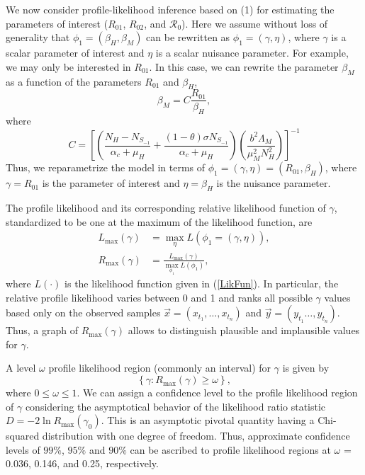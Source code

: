\documentclass[5p, authoryear, final, sort&compress, times]{elsarticle}
\begin{document}
We now consider profile-likelihood inference based on (1) for estimating the parameters of interest ($R_{01}$, $R_{02}$, and $\mathcal{R}_{0}$). Here we assume without loss of generality that $\phi_{1}=\left(\beta_{H},\beta_{M}\right)$ can be rewritten as $\phi_{1}=\left(\gamma,\eta\right)$, where $\gamma$ is a scalar parameter of interest and $\eta$ is a scalar nuisance parameter. For example, we may only be interested in $R_{01}$. In this case, we can rewrite the parameter $\beta_{M}$ as a function of the parameters $R_{01}$ and $\beta_{H}$,
\begin{equation}
\beta_{M}=C\frac{R_{01}}{\beta_{H}}, \nonumber
\end{equation}
where
\begin{equation}
C=\left[\left(\frac{N_H - N_{S_{-1}}}{\alpha_c + \mu_H}+\frac{(1- \theta ) \sigma N_{S_{-1}}}{ \alpha_c + \mu_H}\right)\left(\frac{b^2\Lambda_M}{\mu_M ^ 2  N_H ^ 2}\right)\right]^{-1} \nonumber
\end{equation}
Thus, we reparametrize the model in terms of $\phi_{1}=\left(\gamma,\eta\right)=\left(R_{01},\beta_{H}\right)$, where $\gamma=R_{01}$ is the parameter of interest and $\eta=\beta_{H}$ is the nuisance parameter.

The profile likelihood and its corresponding relative likelihood function of $\gamma$, standardized to be one at the maximum of the likelihood function, are
\begin{equation}
\begin{split}
L_{\max}\left(\gamma\right)&=\max_{\eta}L\left(\phi_{1}=\left(\gamma,\eta \right)\right),  \nonumber \\
R_{\max}\left(\gamma\right)&=\frac{L_{\max}\left(\gamma\right)}{\displaystyle\max_{\phi_{1}}L\left(\phi_{1}\right)},
\end{split}
\end{equation}
where $L\left(\cdot\right)$ is the likelihood function given in (\ref{LikFun}). In particular, the relative profile likelihood varies between 0 and 1 and ranks all possible $\gamma$ values based only on the observed samples $\vec{x}=\left(x_{t_1}, \dots , x_{t_n} \right)$ and $\vec{y}=\left(y_{t_1} \dots , y_{t_n} \right)$. Thus, a graph of $R_{\max}\left(\gamma\right)$ allows to distinguish plausible and implausible values for $\gamma$.

A level $\omega$ profile likelihood region (commonly an interval) for $\gamma$ is given by
\begin{equation}
\left\{\gamma: R_{\max}\left(\gamma\right) \geq \omega \right\}, \nonumber
\end{equation}
where $0 \leq \omega \leq 1$. We can assign a confidence level to the profile likelihood region of $\gamma$  considering the asymptotical behavior of the likelihood ratio statistic $D=-2\ln{R_{\max}\left(\gamma_{0}\right)}$. This is an asymptotic pivotal quantity having a Chi-squared distribution with one degree of freedom. Thus, approximate confidence levels of $99\%$, $95\%$ and $90\%$ can be ascribed to profile likelihood regions at $\omega$ = 0.036, 0.146, and 0.25, respectively.
\end{document}
